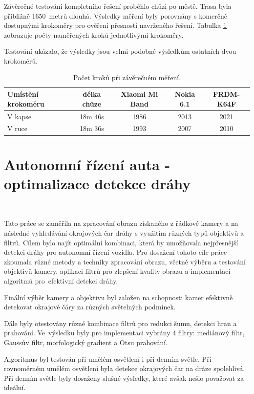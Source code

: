 Závěrečné testování kompletního řešení proběhlo chůzi po městě. Trasa byla přibližně
1650~metrů dlouhá. Výsledky měření byly porovnány s komerčně dostupnými krokoměry
pro ověření přesnosti navrženého řešení. Tabulka \ref{tab:2}  zobrazuje počty
naměřených kroků jednotlivými krokoměry.

Testování ukázalo, že výsledky jsou velmi podobné výsledkům ostatních dvou
krokoměrů\cite{krokomer}.

\begin{table}[!h]
	\centering
	\begin{tabular}{lcccc}
		\toprule
		Umístění krokoměru & délka chůze & Xiaomi Mi Band & Nokia 6.1 & FRDM-K64F \\
		\midrule
		V kapse            & 18m 46s     & 1986           & 2013      & 2021      \\
		V ruce             & 18m 36s     & 1993           & 2007      & 2010      \\
		\bottomrule
	\end{tabular}
	\caption{Počet kroků při závěrečném měření\cite{krokomer}.}
	\label{tab:2}
	\vspace{-10pt}
\end{table}

\section{Autonomní řízení auta - optimalizace detekce dráhy}\

Tato práce se zaměřila na zpracování obrazu získaného z řádkové kamery a na následné
vyhledávání okrajových čar dráhy s využitím různých typů objektivů a filtrů. Cílem
bylo najít optimální kombinaci, která by umožňovala nejpřesnější detekci dráhy pro
autonomní řízení vozidla. Pro dosažení tohoto cíle práce zkoumala různé metody a
techniky zpracování obrazu, včetně výběru a testování objektivů kamery, aplikaci
filtrů pro zlepšení kvality obrazu a implementaci algoritmů pro~efektivní detekci
dráhy.

Finální výběr kamery a objektivu byl založen na schopnosti kamer efektivně detekovat
okrajové čáry za různých světelných podmínek.

Dále byly otestovány různé kombinace filtrů pro redukci šumu, detekci hran a
prahování. Ve~výsledku byly pro implementaci vybrány 4 filtry: mediánový filtr,
Gaussův filtr, morfologický gradient a Otsu prahování.

Algoritmus byl testován při umělém osvětlení i při denním světle. Při rovnoměrném
umělém osvětlení byla detekce okrajových čar na dráze spolehlivá. Při denním světle
byly dosaženy slušné výsledky, které avšak nešlo považovat za ideální\cite{draha}.

